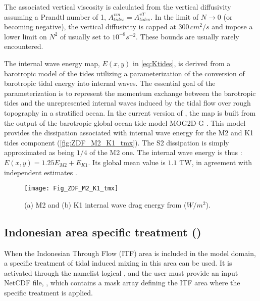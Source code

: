 \documentclass[../main/NEMO_manual]{subfiles}
\begin{document}
The associated vertical viscosity is calculated from the vertical diffusivity assuming a Prandtl number of 1,
\ie $A^{vm}_{tides}=A^{vT}_{tides}$.
In the limit of $N \rightarrow 0$ (or becoming negative), the vertical diffusivity is capped at $300\,cm^2/s$ and
impose a lower limit on $N^2$ of  usually set to $10^{-8} s^{-2}$.
These bounds are usually rarely encountered.

The internal wave energy map, $E(x, y)$ in \autoref{eq:Ktides}, is derived from a barotropic model of
the tides utilizing a parameterization of the conversion of barotropic tidal energy into internal waves.
The essential goal of the parameterization is to represent the momentum exchange between the barotropic tides and
the unrepresented internal waves induced by the tidal flow over rough topography in a stratified ocean.
In the current version of \NEMO, the map is built from the output of
the barotropic global ocean tide model MOG2D-G \citep{Carrere_Lyard_GRL03}.
This model provides the dissipation associated with internal wave energy for the M2 and K1 tides component
(\autoref{fig:ZDF_M2_K1_tmx}).
The S2 dissipation is simply approximated as being $1/4$ of the M2 one.
The internal wave energy is thus : $E(x, y) = 1.25 E_{M2} + E_{K1}$.
Its global mean value is $1.1$ TW,
in agreement with independent estimates \citep{Egbert_Ray_Nat00, Egbert_Ray_JGR01}. 

\begin{figure}[!t]
  \begin{center}
    \texttt{[image: Fig\_ZDF\_M2\_K1\_tmx]}
    \caption{
      \protect\label{fig:ZDF_M2_K1_tmx}
      (a) M2 and (b) K1 internal wave drag energy from \citet{Carrere_Lyard_GRL03} ($W/m^2$).
    }
  \end{center}
\end{figure}
 
\subsection{Indonesian area specific treatment (\protect{})}
\label{subsec:ZDF_tmx_itf}

When the Indonesian Through Flow (ITF) area is included in the model domain,
a specific treatment of tidal induced mixing in this area can be used.
It is activated through the namelist logical , and the user must provide an input NetCDF file,
, which contains a mask array defining the ITF area where the specific treatment is applied.
\end{document}
